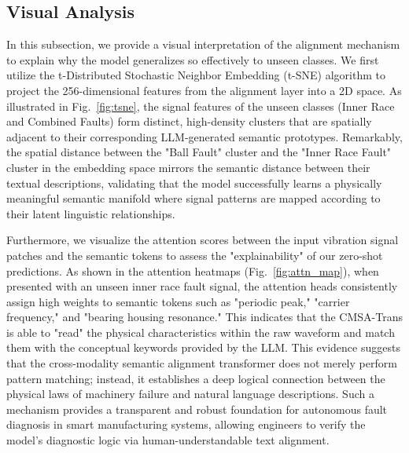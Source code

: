 \documentclass[journal]{IEEEtran}
\begin{document}
\subsection{Visual Analysis}
In this subsection, we provide a visual interpretation of the alignment mechanism to explain why the model generalizes so effectively to unseen classes. We first utilize the t-Distributed Stochastic Neighbor Embedding (t-SNE) algorithm to project the 256-dimensional features from the alignment layer into a 2D space. As illustrated in Fig.~\ref{fig:tsne}, the signal features of the unseen classes (Inner Race and Combined Faults) form distinct, high-density clusters that are spatially adjacent to their corresponding LLM-generated semantic prototypes. Remarkably, the spatial distance between the "Ball Fault" cluster and the "Inner Race Fault" cluster in the embedding space mirrors the semantic distance between their textual descriptions, validating that the model successfully learns a physically meaningful semantic manifold where signal patterns are mapped according to their latent linguistic relationships.

Furthermore, we visualize the attention scores between the input vibration signal patches and the semantic tokens to assess the "explainability" of our zero-shot predictions. As shown in the attention heatmaps (Fig.~\ref{fig:attn_map}), when presented with an unseen inner race fault signal, the attention heads consistently assign high weights to semantic tokens such as "periodic peak," "carrier frequency," and "bearing housing resonance." This indicates that the CMSA-Trans is able to "read" the physical characteristics within the raw waveform and match them with the conceptual keywords provided by the LLM. This evidence suggests that the cross-modality semantic alignment transformer does not merely perform pattern matching; instead, it establishes a deep logical connection between the physical laws of machinery failure and natural language descriptions. Such a mechanism provides a transparent and robust foundation for autonomous fault diagnosis in smart manufacturing systems, allowing engineers to verify the model's diagnostic logic via human-understandable text alignment.
\end{document}

